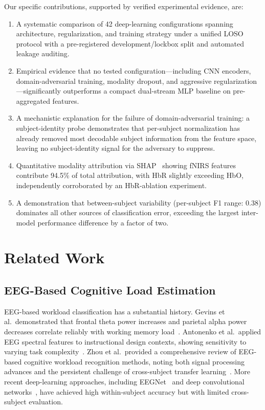 \documentclass[conference]{IEEEtran}
\begin{document}
Our specific contributions, supported by verified experimental evidence, are:
\begin{enumerate}
    \item A systematic comparison of 42 deep-learning configurations spanning architecture, regularization, and training strategy under a unified LOSO protocol with a pre-registered development/lockbox split and automated leakage auditing.
    \item Empirical evidence that no tested configuration---including CNN encoders, domain-adversarial training, modality dropout, and aggressive regularization---significantly outperforms a compact dual-stream MLP baseline on pre-aggregated features.
    \item A mechanistic explanation for the failure of domain-adversarial training: a subject-identity probe demonstrates that per-subject normalization has already removed most decodable subject information from the feature space, leaving no subject-identity signal for the adversary to suppress.
    \item Quantitative modality attribution via SHAP~\cite{lundberg2017unified} showing fNIRS features contribute 94.5\% of total attribution, with HbR slightly exceeding HbO, independently corroborated by an HbR-ablation experiment.
    \item A demonstration that between-subject variability (per-subject F1 range: 0.38) dominates all other sources of classification error, exceeding the largest inter-model performance difference by a factor of two.
\end{enumerate}

\section{Related Work}

\subsection{EEG-Based Cognitive Load Estimation}
EEG-based workload classification has a substantial history. Gevins et al.\ demonstrated that frontal theta power increases and parietal alpha power decreases correlate reliably with working memory load~\cite{gevins1998monitoring}. Antonenko et al.\ applied EEG spectral features to instructional design contexts, showing sensitivity to varying task complexity~\cite{antonenko2010using}. Zhou et al.\ provided a comprehensive review of EEG-based cognitive workload recognition methods, noting both signal processing advances and the persistent challenge of cross-subject transfer learning~\cite{zhou2022cognitive}. More recent deep-learning approaches, including EEGNet~\cite{lawhern2018eegnet} and deep convolutional networks~\cite{schirrmeister2017deep}, have achieved high within-subject accuracy but with limited cross-subject evaluation.
\end{document}
